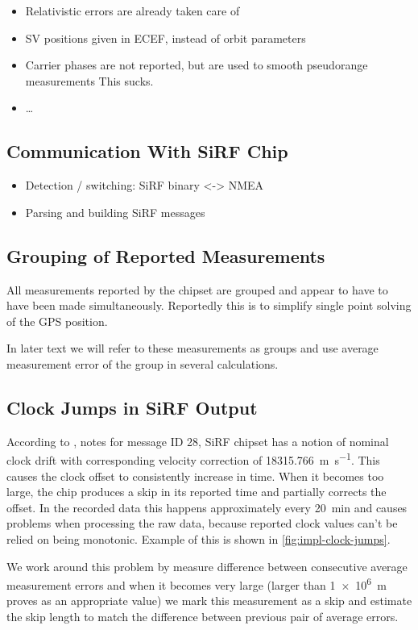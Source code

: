 \begin{itemize}
\item Relativistic errors are already taken care of 
\item SV positions given in ECEF, instead of orbit parameters
\item Carrier phases are not reported, but are used to smooth pseudorange measurements
    This sucks.
\item \ldots
\end{itemize}

\subsection{Communication With SiRF Chip}
\begin{itemize}
\item Detection / switching: SiRF binary <-> NMEA
\item Parsing and building SiRF messages
\end{itemize}

\subsection{Grouping of Reported Measurements}
All measurements reported by the chipset are grouped and appear
to have to have been made simultaneously.
Reportedly this is to simplify single point solving of the GPS position.

In later text we will refer to these measurements as groups and use average
measurement error of the group in several calculations.

\subsection{Clock Jumps in SiRF Output}
According to \cite{sirf-protocol}, notes for message ID 28, SiRF chipset has a
notion of nominal clock drift with corresponding velocity correction of \SI{18315.766}{\meter\per\second}.
This causes the clock offset to consistently increase in time.
When it becomes too large, the chip produces a skip in its reported time and
partially corrects the offset.
In the recorded data this happens approximately every \SI{20}{\minute} and causes
problems when processing the raw data, because reported clock values
can't be relied on being monotonic.
Example of this is shown in \cref{fig:impl-clock-jumps}.

We work around this problem by measure difference between consecutive average
measurement errors and when it becomes very large (larger than \SI{1e6}{\meter} proves as an
appropriate value) we mark this measurement as a skip and estimate the skip
length to match the difference between previous pair of average errors.

